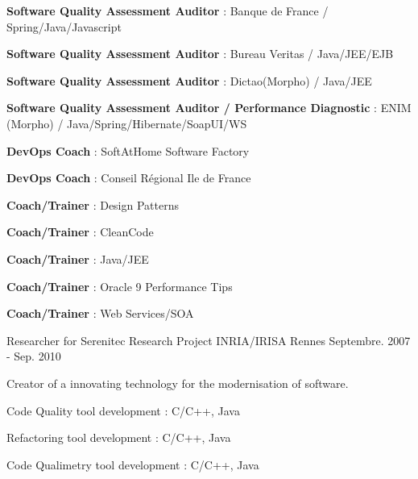 \begin{cventries}
{\begin{cvitems}
		 \item {\textbf{Software Quality Assessment Auditor} : Banque de France / Spring/Java/Javascript}
		 \item {\textbf{Software Quality Assessment Auditor} : Bureau Veritas / Java/JEE/EJB}
		 \item {\textbf{Software Quality Assessment Auditor} : Dictao(Morpho) / Java/JEE}
		 \item {\textbf{Software Quality Assessment Auditor / Performance Diagnostic} : ENIM (Morpho) / Java/Spring/Hibernate/SoapUI/WS}
		 \item {\textbf{DevOps Coach} : SoftAtHome Software Factory}
		 \item {\textbf{DevOps Coach} : Conseil Régional Ile de France}		 
 		 \item {\textbf{Coach/Trainer} : Design Patterns}			 
  		 \item {\textbf{Coach/Trainer} : CleanCode}	
 		 \item {\textbf{Coach/Trainer} : Java/JEE}	
		 \item {\textbf{Coach/Trainer} : Oracle 9 Performance Tips}	
		 \item {\textbf{Coach/Trainer} : Web Services/SOA}	
	  \end{cvitems}
    }

  \cventry
    {Researcher for Serenitec Research Project} %
    {INRIA/IRISA} %
    {Rennes} %
    {Septembre. 2007 - Sep. 2010} %
    {
      \begin{cvitems} %
        \item {Creator of a innovating technology for the modernisation of software.}
        \item {Code Quality tool development : C/C++, Java}
        \item {Refactoring tool development : C/C++, Java}
        \item {Code Qualimetry tool development : C/C++, Java}
      \end{cvitems} 
    }


\end{cventries}

